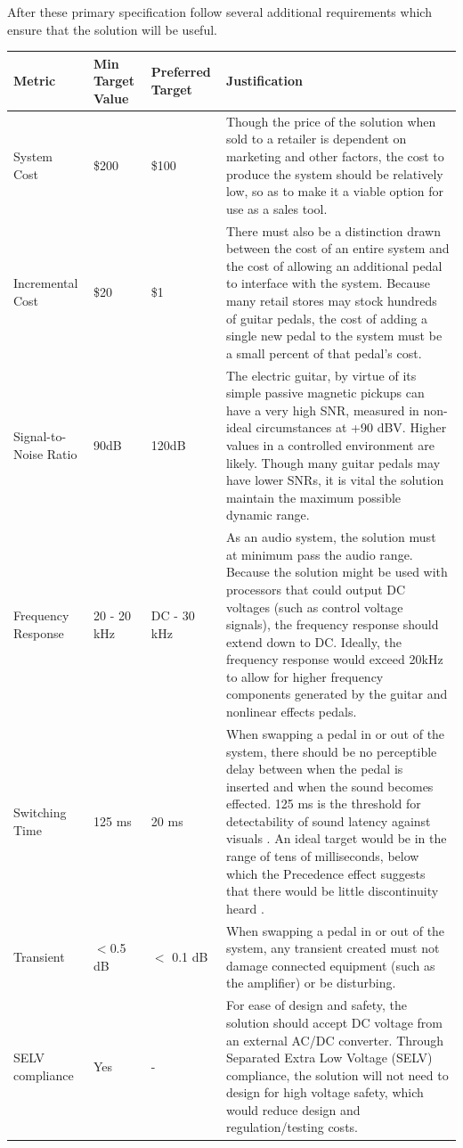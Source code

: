 \documentclass{article}
\begin{document}
	After these primary specification follow several additional requirements which ensure that the solution will be useful.

	\begin{center}
	\renewcommand{\arraystretch}{1.5}
	\begin{longtable}{|l|l|l|p{7cm}|}
		\hline
		Metric & Min Target Value & Preferred Target & Justification \\
		\hline
		System Cost & \$200 & \$100 & Though the price of the solution when sold to a retailer is dependent on marketing and other factors, the cost to produce the system should be relatively low, so as to make it a viable option for use as a sales tool. \\
		Incremental Cost & \$20 & \$1 & There must also be a distinction drawn between the cost of an entire system and the cost of allowing an additional pedal to interface with the system.  Because many retail stores may stock hundreds of guitar pedals, the cost of adding a single new pedal to the system must be a small percent of that pedal's cost. \\
		Signal-to-Noise Ratio & 90dB &  120dB & The electric guitar, by virtue of its simple passive magnetic pickups can have a very high SNR, measured in non-ideal circumstances at +90 dBV.  Higher values in a controlled environment are likely.  Though many guitar pedals may have lower SNRs, it is vital the solution maintain the maximum possible dynamic range. \\
		Frequency Response & 20 - 20 kHz & DC - 30 kHz & As an audio system, the solution must at minimum pass the audio range.  Because the solution might be used with processors that could output DC voltages (such as control voltage signals), the frequency response should extend down to DC.  Ideally, the frequency response would exceed 20kHz to allow for higher frequency components generated by the guitar and nonlinear effects pedals. \\
		Switching Time & 125 ms & 20 ms & When swapping a pedal in or out of the system, there should be no perceptible delay between when the pedal is inserted and when the sound becomes effected.  125 ms is the threshold for detectability of sound latency against visuals \cite{BT1359-1}.  An ideal target would be in the range of tens of milliseconds, below which the Precedence effect suggests that there would be little discontinuity heard \cite{PrecedenceEffect}. \\
		Transient & $<$0.5 dB & $<$ 0.1 dB & When swapping a pedal in or out of the system, any transient created must not damage connected equipment (such as the amplifier) or be disturbing. \\
		SELV compliance	& Yes & - & For ease of design and safety, the solution should accept DC voltage from an external AC/DC converter.  Through Separated Extra Low Voltage (SELV) compliance, the solution will not need to design for high voltage safety, which would reduce design and regulation/testing costs. \\
		\hline
	\end{longtable}
	\end{center}
\end{document}
